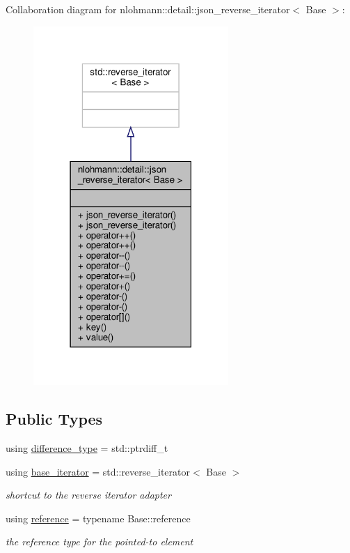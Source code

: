 Collaboration diagram for nlohmann\+:\+:detail\+:\+:json\+\_\+reverse\+\_\+iterator$<$ Base $>$\+:\nopagebreak
\begin{figure}[H]
\begin{center}
\leavevmode
\includegraphics[width=210pt]{classnlohmann_1_1detail_1_1json__reverse__iterator__coll__graph}
\end{center}
\end{figure}
\subsection*{Public Types}
\begin{DoxyCompactItemize}
\item 
using \hyperlink{classnlohmann_1_1detail_1_1json__reverse__iterator_a9ab55987c05ec6427ad36082e351cc45}{difference\+\_\+type} = std\+::ptrdiff\+\_\+t
\item 
using \hyperlink{classnlohmann_1_1detail_1_1json__reverse__iterator_a6b2ef1d632fe49bfcc22fbd1abd62395}{base\+\_\+iterator} = std\+::reverse\+\_\+iterator$<$ Base $>$
\begin{DoxyCompactList}\small\item\em shortcut to the reverse iterator adapter \end{DoxyCompactList}\item 
using \hyperlink{classnlohmann_1_1detail_1_1json__reverse__iterator_a42f51a69bac7b2aebb613b2164e457f1}{reference} = typename Base\+::reference
\begin{DoxyCompactList}\small\item\em the reference type for the pointed-\/to element \end{DoxyCompactList}\end{DoxyCompactItemize}
